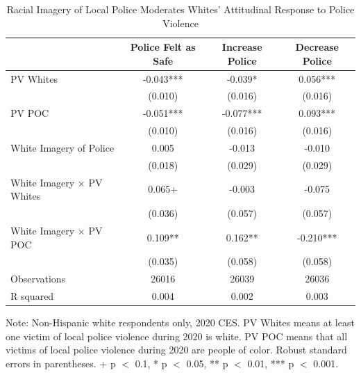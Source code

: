 \documentclass[
  12pt,
]{article}
\begin{document}
\hypertarget{tbl-racial.component}{}
\begin{table}
\caption{\label{tbl-racial.component}Racial Imagery of Local Police Moderates Whites' Attitudinal Response to
Police Violence }\tabularnewline

\centering
\begin{threeparttable}
\begin{tabular}[t]{lccc}
\toprule
  & Police Felt as Safe & Increase Police & Decrease Police\\
\midrule
PV Whites & -0.043*** & -0.039* & 0.056***\\
 & (0.010) & (0.016) & \vphantom{1} (0.016)\\
PV POC & -0.051*** & -0.077*** & 0.093***\\
 & (0.010) & (0.016) & (0.016)\\
White Imagery of Police & 0.005 & -0.013 & -0.010\\
 & (0.018) & (0.029) & (0.029)\\
White Imagery × PV Whites & 0.065+ & -0.003 & -0.075\\
 & (0.036) & (0.057) & (0.057)\\
White Imagery × PV POC & 0.109** & 0.162** & -0.210***\\
 & (0.035) & (0.058) & (0.058)\\
\midrule
Observations & 26016 & 26039 & 26036\\
R squared & 0.004 & 0.002 & 0.003\\
\bottomrule
\end{tabular}
\begin{tablenotes}
\item Note: Non-Hispanic white respondents only, 2020 CES. PV Whites means at least one victim of local police violence during 2020 is white. PV POC means that all victims of local police violence during 2020 are people of color. Robust standard errors in parentheses. + p $<$ 0.1, * p $<$ 0.05, ** p $<$ 0.01, *** p $<$ 0.001.
\end{tablenotes}
\end{threeparttable}
\end{table}
\end{document}
